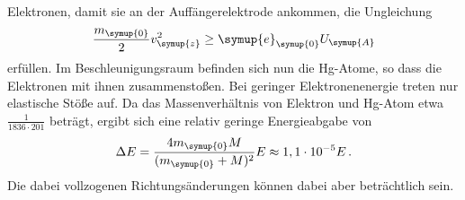 Elektronen, damit sie an der Auffängerelektrode ankommen, die Ungleichung
\begin{equation}
    \label{eqn:E_Ungleichung}
    \frac{m_{\symup{0}}}{2} v_{\symup{z}}^2 \geq \symup{e}_{\symup{0}} U_{\symup{A}}
\end{equation}
erfüllen. Im Beschleunigungsraum befinden sich nun die Hg-Atome, so dass die Elektronen mit ihnen zusammenstoßen.
Bei geringer Elektronenenergie treten nur elastische Stöße auf. Da das Massenverhältnis von Elektron und Hg-Atom
etwa $\frac{1}{1836 \cdot 201}$ beträgt, ergibt sich eine relativ geringe Energieabgabe von
\begin{equation}
    \label{eqn:EnergieAbgabe}
    \Delta E = \frac{4 m_{\symup{0}} M}{(m_{\symup{0}} + M)^2} E \approx 1,1\cdot 10^{-5} E\,.
\end{equation}
Die dabei vollzogenen Richtungsänderungen können dabei aber beträchtlich sein.